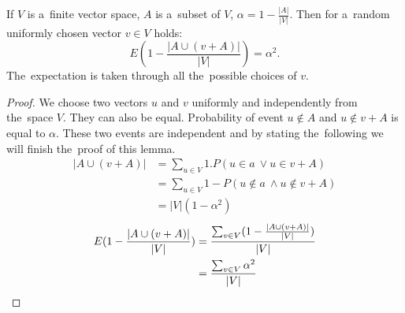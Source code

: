 \begin{lemma}
\label{lemma-choose-random-vector}
If $V$ is a~finite vector space, $A$ is a~subset of $V$, $\alpha = 1 - \frac{|A|}{|V|}$. Then for a~random uniformly chosen vector $v \in V$ holds:
\begin{displaymath}
E (1 - \frac{|A \cup (v + A)|}{|V|}) = \alpha^2 \textit{.}
\end{displaymath}
The~expectation is taken through all the~possible choices of $v$.
\end{lemma}
\begin{proof}
We choose two vectors $u$ and $v$ uniformly and independently from the~space $V$. They can also be equal. Probability of event $u \notin A$ and $u \notin v + A$ is equal to $\alpha$. These two events are independent and by stating the~following we will finish the~proof of this lemma.
\begin{displaymath}
\begin{split}
|A \cup (v + A)| 
	& = \sum_{u \in V} 1 . P(u \in a~\vee u \in v + A) \\ 
	& = \sum_{u \in V} 1 - P(u \notin a~\wedge u \notin v + A) \\ 
	& = |V| (1 - \alpha ^ 2)
\end{split}
\end{displaymath}
\begin{displaymath}
\begin{split}
E (1 - \frac{|A \cup (v + A)|}{|V|}) 
	& = \frac{\sum\displaylimits_{v \in V}(1 - \frac{|A \cup (v + A)|}{|V|})}{|V|} \\
	& = \frac{\sum\displaylimits_{v \in V}\alpha ^ 2}{|V|}
\end{split}
\end{displaymath}
\end{proof}

